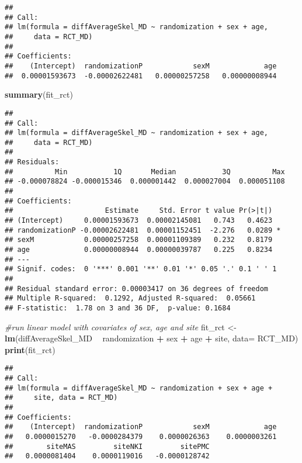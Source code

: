 \documentclass[]{article}
\newenvironment{Shaded}{\begin{snugshade}}{\end{snugshade}}
\newcommand{\KeywordTok}[1]{\textcolor[rgb]{0.13,0.29,0.53}{\textbf{#1}}}
\newcommand{\DataTypeTok}[1]{\textcolor[rgb]{0.13,0.29,0.53}{#1}}
\newcommand{\StringTok}[1]{\textcolor[rgb]{0.31,0.60,0.02}{#1}}
\newcommand{\CommentTok}[1]{\textcolor[rgb]{0.56,0.35,0.01}{\textit{#1}}}
\newcommand{\OperatorTok}[1]{\textcolor[rgb]{0.81,0.36,0.00}{\textbf{#1}}}
\newcommand{\NormalTok}[1]{#1}
\theoremstyle{definition}
\theoremstyle{definition}
\theoremstyle{definition}
\theoremstyle{remark}
\begin{document}
\begin{verbatim}
## 
## Call:
## lm(formula = diffAverageSkel_MD ~ randomization + sex + age, 
##     data = RCT_MD)
## 
## Coefficients:
##    (Intercept)  randomizationP            sexM             age  
##  0.00001593673  -0.00002622481   0.00000257258   0.00000008944
\end{verbatim}

\begin{Shaded}
\begin{Highlighting}[]
\KeywordTok{summary}\NormalTok{(fit_rct)}
\end{Highlighting}
\end{Shaded}

\begin{verbatim}
## 
## Call:
## lm(formula = diffAverageSkel_MD ~ randomization + sex + age, 
##     data = RCT_MD)
## 
## Residuals:
##          Min           1Q       Median           3Q          Max 
## -0.000078824 -0.000015346  0.000001442  0.000027004  0.000051108 
## 
## Coefficients:
##                      Estimate     Std. Error t value Pr(>|t|)  
## (Intercept)     0.00001593673  0.00002145081   0.743   0.4623  
## randomizationP -0.00002622481  0.00001152451  -2.276   0.0289 *
## sexM            0.00000257258  0.00001109389   0.232   0.8179  
## age             0.00000008944  0.00000039787   0.225   0.8234  
## ---
## Signif. codes:  0 '***' 0.001 '**' 0.01 '*' 0.05 '.' 0.1 ' ' 1
## 
## Residual standard error: 0.00003417 on 36 degrees of freedom
## Multiple R-squared:  0.1292, Adjusted R-squared:  0.05661 
## F-statistic:  1.78 on 3 and 36 DF,  p-value: 0.1684
\end{verbatim}

\begin{Shaded}
\begin{Highlighting}[]
\CommentTok{#run linear model with covariates of sex, age and site}
\NormalTok{fit_rct <-}\StringTok{ }\KeywordTok{lm}\NormalTok{(diffAverageSkel_MD }\OperatorTok{~}\StringTok{ }\NormalTok{randomization }\OperatorTok{+}\StringTok{ }\NormalTok{sex }\OperatorTok{+}\StringTok{ }\NormalTok{age }\OperatorTok{+}\StringTok{ }\NormalTok{site, }\DataTypeTok{data=}\NormalTok{ RCT_MD)}
\KeywordTok{print}\NormalTok{(fit_rct)}
\end{Highlighting}
\end{Shaded}

\begin{verbatim}
## 
## Call:
## lm(formula = diffAverageSkel_MD ~ randomization + sex + age + 
##     site, data = RCT_MD)
## 
## Coefficients:
##    (Intercept)  randomizationP            sexM             age  
##   0.0000015270   -0.0000284379    0.0000026363    0.0000003261  
##        siteMAS         siteNKI         sitePMC  
##   0.0000081404    0.0000119016   -0.0000128742
\end{verbatim}
\end{document}
